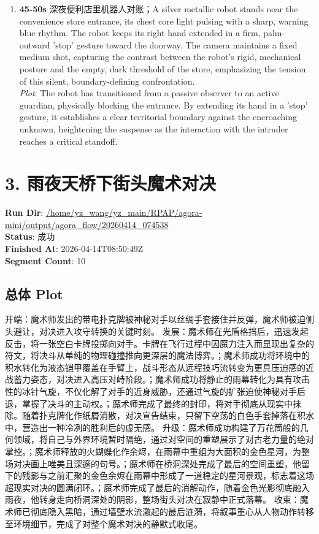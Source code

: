 \documentclass[11pt,a4paper]{article}
\begin{document}
\begin{enumerate}
\item \textbf{45-50s} 深夜便利店里机器人对账；A silver metallic robot stands near the convenience store entrance, its chest core light pulsing with a sharp, warning blue rhythm. The robot keeps its right hand extended in a firm, palm-outward 'stop' gesture toward the doorway. The camera maintains a fixed medium shot, capturing the contrast between the robot's rigid, mechanical posture and the empty, dark threshold of the store, emphasizing the tension of this silent, boundary-defining confrontation.\\\newline \textit{Plot}: The robot has transitioned from a passive observer to an active guardian, physically blocking the entrance. By extending its hand in a 'stop' gesture, it establishes a clear territorial boundary against the encroaching unknown, heightening the suspense as the interaction with the intruder reaches a critical standoff.
\end{enumerate}

\section{3. 雨夜天桥下街头魔术对决}
\textbf{Run Dir}: \url{/home/yz\_wang/yz\_main/RPAP/agora-mini/output/agora\_flow/20260414\_074538}\\
\textbf{Status}: 成功\\
\textbf{Finished At}: 2026-04-14T08:50:49Z\\
\textbf{Segment Count}: 10

\subsection*{总体 Plot}
开端：魔术师发出的带电扑克牌被神秘对手以丝绸手套接住并反弹，魔术师被迫侧头避让，对决进入攻守转换的关键时刻。 发展：魔术师在光盾格挡后，迅速发起反击，将一张空白卡牌投掷向对手。卡牌在飞行过程中因魔力注入而显现出复杂的符文，将决斗从单纯的物理碰撞推向更深层的魔法博弈。；魔术师成功将环境中的积水转化为液态铠甲覆盖在手臂上，战斗形态从远程技巧流转变为更具压迫感的近战蓄力姿态，对决进入高压对峙阶段。；魔术师成功将静止的雨幕转化为具有攻击性的冰针气旋，不仅化解了对手的近身威胁，还通过气旋的扩张迫使神秘对手后退，掌握了决斗的主动权。；魔术师完成了最终的封印，将对手彻底从现实中抹除。随着扑克牌化作纸屑消散，对决宣告结束，只留下空荡的白色手套掉落在积水中，营造出一种冷冽的胜利后的虚无感。 升级：魔术师成功构建了万花筒般的几何领域，将自己与外界环境暂时隔绝，通过对空间的重塑展示了对古老力量的绝对掌控。；魔术师释放的火蝴蝶化作余烬，在雨幕中重组为大面积的金色星河，为整场对决画上唯美且深邃的句号。；魔术师在桥洞深处完成了最后的空间重塑，他留下的残影与之前汇聚的金色余烬在雨幕中形成了一道稳定的星河景观，标志着这场超现实对决的圆满闭环。；魔术师完成了最后的消解动作，随着金色光影彻底融入雨夜，他转身走向桥洞深处的阴影，整场街头对决在寂静中正式落幕。 收束：魔术师已彻底隐入黑暗，通过墙壁水流激起的最后涟漪，将叙事重心从人物动作转移至环境细节，完成了对整个魔术对决的静默式收尾。
\end{document}
